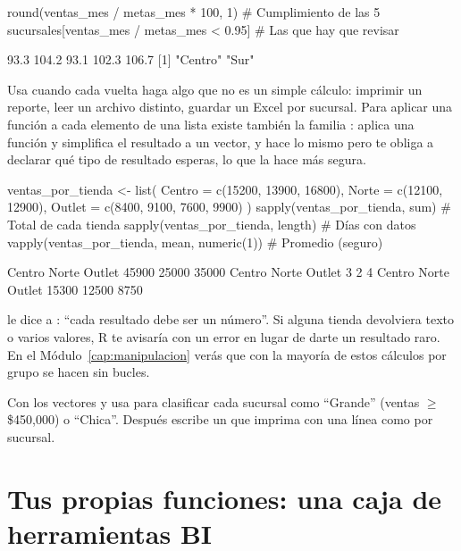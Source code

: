 \begin{rcode}
round(ventas_mes / metas_mes * 100, 1)       # Cumplimiento de las 5
sucursales[ventas_mes / metas_mes < 0.95]    # Las que hay que revisar
\end{rcode}
\begin{rsalida}
[1]  93.3 104.2  93.1 102.3 106.7
[1] "Centro" "Sur"   
\end{rsalida}

Usa  cuando cada vuelta haga algo que no es un simple cálculo:
imprimir un reporte, leer un archivo distinto, guardar un Excel por
sucursal. Para aplicar una función a cada elemento de una lista existe
también la familia :  aplica una función y
simplifica el resultado a un vector, y  hace lo mismo
pero te obliga a declarar qué tipo de resultado esperas, lo que la hace más
segura.

\begin{rcode}
ventas_por_tienda <- list(
  Centro = c(15200, 13900, 16800),
  Norte = c(12100, 12900),
  Outlet = c(8400, 9100, 7600, 9900)
)
sapply(ventas_por_tienda, sum)                  # Total de cada tienda
sapply(ventas_por_tienda, length)               # Días con datos
vapply(ventas_por_tienda, mean, numeric(1))     # Promedio (seguro)
\end{rcode}
\begin{rsalida}
Centro  Norte Outlet 
 45900  25000  35000 
Centro  Norte Outlet 
     3      2      4 
Centro  Norte Outlet 
 15300  12500   8750 
\end{rsalida}

 le dice a : ``cada resultado debe ser
un número''. Si alguna tienda devolviera texto o varios valores, R te
avisaría con un error en lugar de darte un resultado raro. En el
Módulo~\ref{cap:manipulacion} verás que con  la mayoría de
estos cálculos por grupo se hacen sin bucles.

\begin{hazlotu}
Con los vectores  y  usa
 para clasificar cada sucursal como ``Grande'' (ventas
$\geq$ \$450,000) o ``Chica''. Después escribe un  que imprima
con  una línea como  por sucursal.
\end{hazlotu}

\section{Tus propias funciones: una caja de herramientas BI}
\label{sec:m1-funciones}

